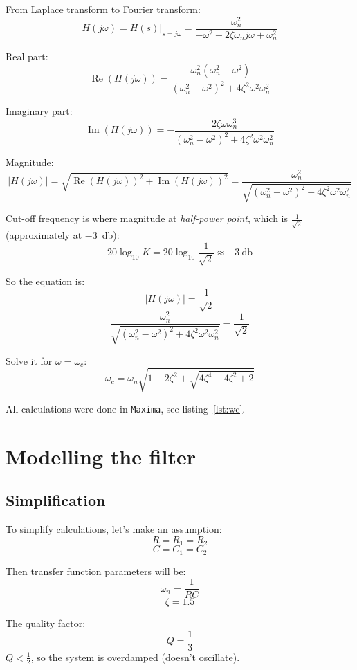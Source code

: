 \documentclass[12pt, a4paper]{article}
\renewcommand{\Re}{\operatorname{Re}}
\renewcommand{\Im}{\operatorname{Im}}
\providecommand{\abs}[1]{\lvert#1\rvert}
\newcommand{\appname}[1]{\texttt{#1}}
\begin{document}
From Laplace transform to Fourier transform:
\[ H(j \omega) = H(s)\bigr\rvert_{s = j \omega}
   = \frac{\omega_n^2}{-\omega^2 + 2 \zeta \omega_n j \omega + \omega_n^2} \]

Real part:
\[ \Re(H(j \omega)) =
   \frac{\omega_n^2 (\omega_n^2 - \omega^2)}
        {(\omega_n^2 - \omega^2)^2 + 4 \zeta^2 \omega^2 \omega_n^2} \]

Imaginary part:
\[ \Im(H(j \omega)) =
   - \frac{2 \zeta \omega \omega_n^3}
          {(\omega_n^2 - \omega^2)^2 + 4 \zeta^2 \omega^2 \omega_n^2} \]

Magnitude:
\[ \abs{H(j \omega)} = \sqrt{\Re(H(j \omega))^2 + \Im(H(j \omega))^2}
   = \frac{\omega_n^2}{\sqrt{(\omega_n^2 - \omega^2)^2
                             + 4 \zeta^2 \omega^2 \omega_n^2}} \]

Cut-off frequency is where magnitude at \textit{half-power point}, which is
$\frac{1}{\sqrt{2}}$ (approximately at \SI{-3}{\decibel}):
\[ 20 \log_{10}{K} = 20 \log_{10}{\frac{1}{\sqrt{2}}} \approx
   \SI{-3}{\decibel} \]

So the equation is:
\[ \abs{H(j \omega)} = \frac{1}{\sqrt{2}} \]
\[ \frac{\omega_n^2}{\sqrt{(\omega_n^2 - \omega^2)^2
                           + 4 \zeta^2 \omega^2 \omega_n^2}}
   = \frac{1}{\sqrt{2}} \]

Solve it for $\omega = \omega_c$:
\[ \omega_c = \omega_n \sqrt{1 - 2 \zeta^2
                             + \sqrt{4 \zeta^4 - 4 \zeta^2 + 2}} \]

All calculations were done in \appname{Maxima}, see listing~\ref{lst:wc}.



\section{Modelling the filter}

\subsection{Simplification}

To simplify calculations, let's make an assumption:
\[ R = R_1 = R_2 \]
\[ C = C_1 = C_2 \]

Then transfer function parameters will be:
\[ \omega_n = \frac{1}{R C} \]
\[ \zeta = 1.5 \]

The quality factor:
\[ Q = \frac{1}{3} \]
$Q < \frac{1}{2}$, so the system is overdamped (doesn't oscillate).
\end{document}
